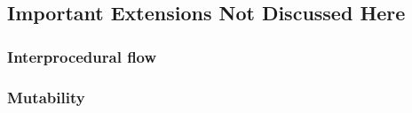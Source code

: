 \documentclass{article}
\theoremstyle{definition}
\begin{document}
\subsection*{Important Extensions Not Discussed Here}

\subsubsection*{Interprocedural flow}

\subsubsection*{Mutability}
\end{document}
